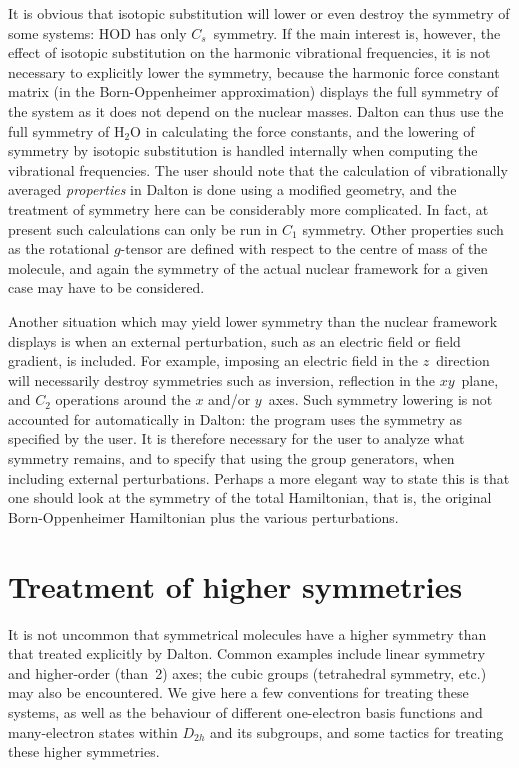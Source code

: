 It is obvious that isotopic substitution will lower or even destroy
the symmetry of some systems: HOD has only $C_s$~symmetry.  If the
main interest is, however, the effect of isotopic substitution on the
harmonic vibrational frequencies, it is not necessary to explicitly
lower the symmetry, because the harmonic force constant matrix (in the
Born-Oppenheimer approximation) displays the full symmetry of the
system as it does not depend on the nuclear masses.  Dalton can thus
use the full symmetry of H$_2$O in calculating the force constants,
and the lowering of symmetry by isotopic substitution is handled
internally when computing the vibrational frequencies.  The user
should note that the calculation of vibrationally averaged
\emph{properties} in Dalton is done using a modified geometry, and the
treatment of symmetry here can be considerably more complicated.
In fact, at present such calculations can only be run in $C_1$
symmetry.  Other properties such as the rotational \mbox{$g$-tensor}
are defined with respect to the centre of mass of the molecule, and
again the symmetry of the actual nuclear framework for a given case
may have to be considered.

Another situation which may yield lower symmetry than the nuclear
framework displays is when an external perturbation, such as an
electric field or field gradient, is included.  For example, imposing
an electric field in the $z$~direction will necessarily destroy
symmetries such as inversion, reflection in the $xy$~plane, and $C_2$
operations around the $x$ and/or $y$~axes.  Such symmetry lowering is
not accounted for automatically in Dalton: the program uses the
symmetry as specified by the user.  It is therefore necessary for the
user to analyze what symmetry remains, and to specify that using the
group generators, when including external perturbations.  Perhaps a
more elegant way to state this is that one should look at the symmetry
of the total Hamiltonian, that is, the original Born-Oppenheimer
Hamiltonian plus the various perturbations.

\section{Treatment of higher symmetries}

It is not uncommon that symmetrical molecules have a higher symmetry
than that treated explicitly by Dalton.  Common examples include
linear symmetry and higher-order (than~2) axes; the cubic groups
(tetrahedral symmetry, etc.) may also be encountered.  We give here a
few conventions for treating these systems, as well as the behaviour
of different one-electron basis functions and many-electron states
within $D_{2h}$ and its subgroups, and some tactics for treating these
higher symmetries.

